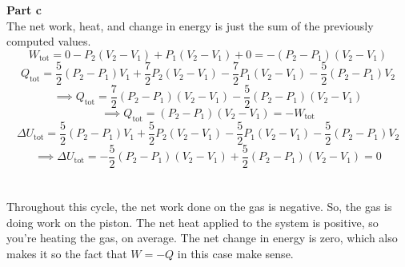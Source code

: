 \documentclass[12pt]{article}
\begin{document}
\begin{flushleft}
\textbf{Part c}\\
The net work, heat, and change in energy is just the sum of the previously computed values.
$$W_\text{tot}=0-P_2(V_2-V_1)+P_1(V_2-V_1)+0=-(P_2-P_1)(V_2-V_1)$$
$$Q_\text{tot}=\frac{5}{2}(P_2-P_1)V_1+\frac{7}{2}P_2(V_2-V_1)-\frac{7}{2}P_1(V_2-V_1)-\frac{5}{2}(P_2-P_1)V_2$$
$$\implies Q_\text{tot}=\frac{7}{2}(P_2-P_1)(V_2-V_1)-\frac{5}{2}(P_2-P_1)(V_2-V_1)$$
$$\implies Q_\text{tot}=(P_2-P_1)(V_2-V_1)=-W_\text{tot}$$
$$\Delta U_\text{tot}=\frac{5}{2}(P_2-P_1)V_1+\frac{5}{2}P_2(V_2-V_1)-\frac{5}{2}P_1(V_2-V_1)-\frac{5}{2}(P_2-P_1)V_2$$
$$\implies\Delta U_\text{tot}=-\frac{5}{2}(P_2-P_1)(V_2-V_1)+\frac{5}{2}(P_2-P_1)(V_2-V_1)=0$$\\~\\

Throughout this cycle, the net work done on the gas is negative.
So, the gas is doing work on the piston.
The net heat applied to the system is positive, so you're heating the gas, on average.
The net change in energy is zero, which also makes it so the fact that $W=-Q$ in this case make sense.





\end{flushleft}
\end{document}
